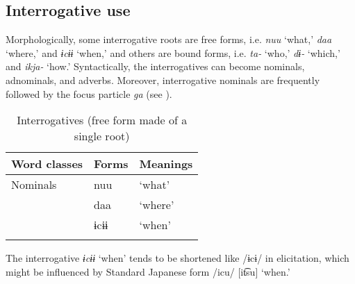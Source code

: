 \subsection{Interrogative use}

Morphologically, some interrogative roots are free forms, i.e. \textit{nuu} ‘what,’ \textit{daa} ‘where,’ and \textit{ɨcɨɨ} ‘when,’ and others are bound forms, i.e. \textit{ta-} ‘who,’ \textit{dɨ-} ‘which,’ and \textit{ikja-} ‘how.’ Syntactically, the interrogatives can become nominals, adnominals, and adverbs. Moreover, interrogative nominals are frequently followed by the focus particle \textit{ga} (see ).

\begin{table}
\caption{\label{tab:key:38}Interrogatives (free form made of a single root)}
\begin{tabular}{lll}
Word classes  &  Forms & Meanings\\\midrule
Nominals  &  nuu  & ‘what’\\
          &  daa  & ‘where’\\
          &  ɨcɨɨ & ‘when’\\
\lspbottomrule
\end{tabular}
\end{table}

The interrogative \textit{ɨcɨɨ} ‘when’ tends to be shortened like /ɨcɨ/ in elicitation, which might be influenced by Standard Japanese form /icu/ [it͡su] ‘when.’

